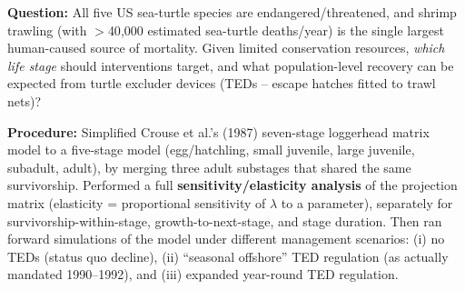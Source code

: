 \documentclass[11pt,a4paper]{article}
\begin{document}
\begin{papbox}[title={Paper Summary: Crowder, Crouse, Heppell \& Martin (1994), \textit{Ecol.\ Appl.} -- ``Predicting the Impact of Turtle Excluder Devices on Loggerhead Sea Turtle Populations''}]
\textbf{Question:} All five US sea-turtle species are endangered/threatened, and shrimp trawling (with $>$40{,}000 estimated sea-turtle deaths/year) is the single largest human-caused source of mortality. Given limited conservation resources, \emph{which life stage} should interventions target, and what population-level recovery can be expected from turtle excluder devices (TEDs -- escape hatches fitted to trawl nets)?

\textbf{Procedure:} Simplified Crouse et al.'s (1987) seven-stage loggerhead matrix model to a five-stage model (egg/hatchling, small juvenile, large juvenile, subadult, adult), by merging three adult substages that shared the same survivorship. Performed a full \textbf{sensitivity/elasticity analysis} of the projection matrix (elasticity = proportional sensitivity of $\lambda$ to a parameter), separately for survivorship-within-stage, growth-to-next-stage, and stage duration. Then ran forward simulations of the model under different management scenarios: (i) no TEDs (status quo decline), (ii) ``seasonal offshore'' TED regulation (as actually mandated 1990--1992), and (iii) expanded year-round TED regulation.


\end{papbox}
\end{document}
